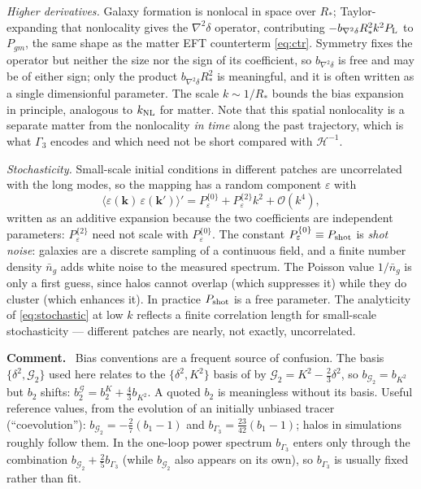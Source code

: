 \documentclass[a4paper,11pt]{article}
\newcommand{\vk}{\bm{k}}
\def\cH{\mathcal{H}}
\def\Plin{P_{\rm L}}
\def\knl{k_{\rm NL}}
\def\G{\mathcal{G}}
\numberwithin{equation}{section}
\newenvironment{remark}
  {\par\medskip\noindent\begingroup\small\color{ForestGreen!60!black}\textbf{Comment.}\ }
  {\endgroup\par\medskip}
\begin{document}
\emph{Higher derivatives.} Galaxy formation is nonlocal in space over $R_*$; Taylor-expanding that nonlocality gives the $\nabla^2\delta$ operator, contributing $-b_{\nabla^2\delta}R_*^2k^2\Plin$ to $P_{gm}$, the same shape as the matter EFT counterterm \eqref{eq:ctr}. Symmetry fixes the operator but neither the size nor the sign of its coefficient, so $b_{\nabla^2\delta}$ is free and may be of either sign; only the product $b_{\nabla^2\delta}R_*^2$ is meaningful, and it is often written as a single dimensionful parameter. The scale $k \sim 1/R_*$ bounds the bias expansion in principle, analogous to $\knl$ for matter. Note that this spatial nonlocality is a separate matter from the nonlocality \emph{in time} along the past trajectory, which is what $\Gamma_3$ encodes and which need not be short compared with $\cH^{-1}$.

\emph{Stochasticity.} Small-scale initial conditions in different patches are uncorrelated with the long modes, so the mapping has a random component $\varepsilon$ with
\begin{equation}
\langle\varepsilon(\vk)\,\varepsilon(\vk')\rangle'
= P_\varepsilon^{\{0\}} + P_\varepsilon^{\{2\}}k^2 + \mathcal{O}(k^4),
\label{eq:stochastic}
\end{equation}
written as an additive expansion because the two coefficients are independent parameters: $P_\varepsilon^{\{2\}}$ need not scale with $P_\varepsilon^{\{0\}}$. The constant $P_\varepsilon^{\{0\}} \equiv P_{\rm shot}$ is \emph{shot noise}: galaxies are a discrete sampling of a continuous field, and a finite number density $\bar n_g$ adds white noise to the measured spectrum. The Poisson value $1/\bar n_g$ is only a first guess, since halos cannot overlap (which suppresses it) while they do cluster (which enhances it). In practice $P_{\rm shot}$ is a free parameter. The analyticity of \eqref{eq:stochastic} at low $k$ reflects a finite correlation length for small-scale stochasticity --- different patches are nearly, not exactly, uncorrelated.

\begin{remark}
Bias conventions are a frequent source of confusion. The basis $\{\delta^2, \G_2\}$ used here relates to the $\{\delta^2, K^2\}$ basis of \cite{Desjacques2018} by $\G_2 = K^2 - \tfrac23\delta^2$, so $b_{\G_2} = b_{K^2}$ but $b_2$ shifts: $b_2^{\G} = b_2^{K} + \tfrac43 b_{K^2}$. A quoted $b_2$ is meaningless without its basis. Useful reference values, from the evolution of an initially unbiased tracer (``coevolution''): $b_{\G_2} = -\tfrac27(b_1-1)$ and $b_{\Gamma_3} = \tfrac{23}{42}(b_1-1)$; halos in simulations roughly follow them. In the one-loop power spectrum $b_{\Gamma_3}$ enters only through the combination $b_{\G_2} + \tfrac25 b_{\Gamma_3}$ (while $b_{\G_2}$ also appears on its own), so $b_{\Gamma_3}$ is usually fixed rather than fit.
\end{remark}
\end{document}
